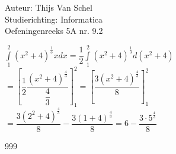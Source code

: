 \documentclass[a4paper]{article}
\newcommand{\dint}{\displaystyle\int}
\begin{document}
  
\noindent \large Auteur: Thijs Van Schel \\
\noindent \large Studierichting: Informatica\\
\noindent \large Oefeningenreeks 5A nr. 9.2\\

\medskip

\normalsize

$\dint\limits_1^2 (x^2+4)^{\tfrac{1}{3}} xdx = \dfrac{1}{2}\dint\limits_1^2 (x^2+4)^{\tfrac{1}{3}}d(x^2+4)$\\

$= \left[\dfrac{1}{2}\dfrac{(x^2+4)^{\tfrac{4}{3}}}{\dfrac{4}{3}}\right]^2_1=\left[\dfrac{3(x^2+4)^{\tfrac{4}{3}}}{8}\right]^2_1$\\

$= \dfrac{3(2^2+4)^{\tfrac{4}{3}}}{8}-\dfrac{3(1+4)^{\tfrac{4}{3}}}{8}=6-\dfrac{3\cdot5^{\tfrac{4}{3}}}{8}$

\begin{thebibliography}{999}
\end{thebibliography}
\end{document}
